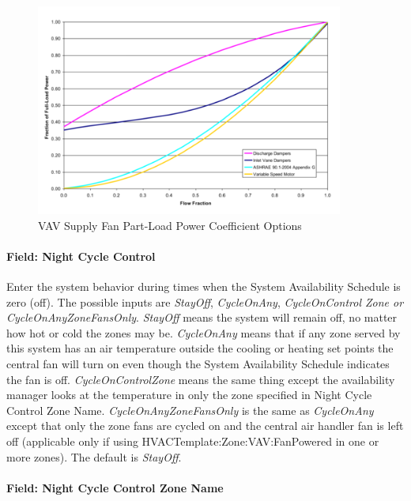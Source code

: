 \begin{figure}[hbtp] %
\centering
\includegraphics[width=0.9\textwidth, height=0.9\textheight, keepaspectratio=true]{media/image612.png}
\caption{VAV Supply Fan Part-Load Power Coefficient Options \protect \label{fig:vav-supply-fan-part-load-power-coefficient-001}}
\end{figure}

\paragraph{Field: Night Cycle Control}\label{field-night-cycle-control-3}

Enter the system behavior during times when the System Availability Schedule is zero (off). The possible inputs are \emph{StayOff}, \emph{CycleOnAny}, \emph{CycleOnControl Zone or CycleOnAnyZoneFansOnly}. \emph{StayOff} means the system will remain off, no matter how hot or cold the zones may be. \emph{CycleOnAny} means that if any zone served by this system has an air temperature outside the cooling or heating set points the central fan will turn on even though the System Availability Schedule indicates the fan is off. \emph{CycleOnControlZone} means the same thing except the availability manager looks at the temperature in only the zone specified in Night Cycle Control Zone Name. \emph{CycleOnAnyZoneFansOnly} is the same as \emph{CycleOnAny} except that only the zone fans are cycled on and the central air handler fan is left off (applicable only if using HVACTemplate:Zone:VAV:FanPowered in one or more zones). The default is \emph{StayOff}.

\paragraph{Field: Night Cycle Control Zone Name}\label{field-night-cycle-control-zone-name-3}

